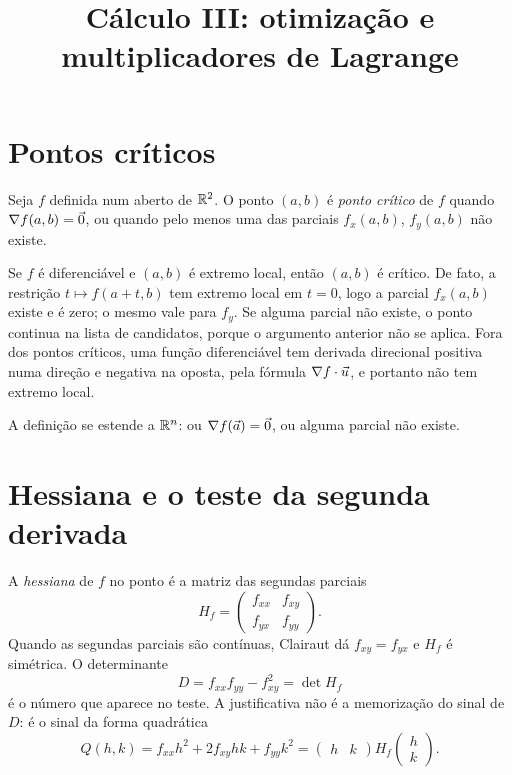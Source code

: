 \documentclass[11pt,a4paper]{article}
\title{Cálculo III: otimização e multiplicadores de Lagrange}
\author{}
\date{}
\begin{document}
\maketitle
\tableofcontents

\section{Pontos críticos}


\begin{definicao}
Seja $f$ definida num aberto de $\mathbb{R}^2$. O ponto $(a,b)$ é \emph{ponto crítico} de $f$ quando $\nabla f(a,b)=\vec{0}$, ou quando pelo menos uma das parciais $f_x(a,b)$, $f_y(a,b)$ não existe.
\end{definicao}

Se $f$ é diferenciável e $(a,b)$ é extremo local, então $(a,b)$ é crítico. De fato, a restrição $t\mapsto f(a+t,b)$ tem extremo local em $t=0$, logo a parcial $f_x(a,b)$ existe e é zero; o mesmo vale para $f_y$. Se alguma parcial não existe, o ponto continua na lista de candidatos, porque o argumento anterior não se aplica. Fora dos pontos críticos, uma função diferenciável tem derivada direcional positiva numa direção e negativa na oposta, pela fórmula $\nabla f\cdot\vec{u}$, e portanto não tem extremo local.

A definição se estende a $\mathbb{R}^n$: ou $\nabla f(\vec{a})=\vec{0}$, ou alguma parcial não existe.

\section{Hessiana e o teste da segunda derivada}

A \emph{hessiana} de $f$ no ponto é a matriz das segundas parciais
\[
H_f=\begin{pmatrix} f_{xx} & f_{xy} \\ f_{yx} & f_{yy} \end{pmatrix}.
\]
Quando as segundas parciais são contínuas, Clairaut dá $f_{xy}=f_{yx}$ e $H_f$ é simétrica. O determinante
\[
D=f_{xx}f_{yy}-f_{xy}^2=\det H_f
\]
é o número que aparece no teste. A justificativa não é a memorização do sinal de $D$: é o sinal da forma quadrática
\[
Q(h,k)=f_{xx}h^2+2f_{xy}hk+f_{yy}k^2=\begin{pmatrix}h & k\end{pmatrix} H_f\begin{pmatrix}h\\ k\end{pmatrix}.
\]
\end{document}
